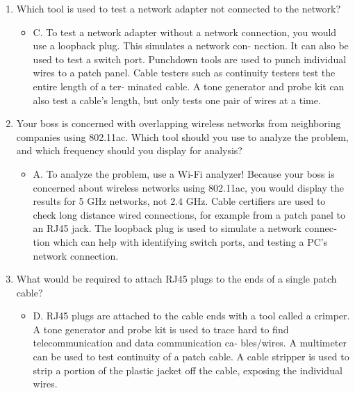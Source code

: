 \documentclass{article}
\begin{document}
\begin{enumerate}
\begin{itemize}
    \end{itemize}
    \item Which tool is used to test a network adapter not connected to
the network?
    \begin{itemize}
        \item C. To test a network adapter without a network connection,
you would use a loopback plug. This simulates a network con‐
nection. It can also be used to test a switch port. Punchdown
tools are used to punch individual wires to a patch panel. Cable
testers such as continuity testers test the entire length of a ter‐
minated cable. A tone generator and probe kit can also test a
cable’s length, but only tests one pair of wires at a time.
    \end{itemize}
    \item Your boss is concerned with overlapping wireless networks
from neighboring companies using 802.11ac. Which tool
should you use to analyze the problem, and which frequency
should you display for analysis?
    \begin{itemize}
        \item A. To analyze the problem, use a Wi-Fi analyzer! Because
your boss is concerned about wireless networks using
802.11ac, you would display the results for 5 GHz networks,
not 2.4 GHz. Cable certifiers are used to check long distance
wired connections, for example from a patch panel to an RJ45
jack. The loopback plug is used to simulate a network connec‐
tion which can help with identifying switch ports, and testing a
PC’s network connection.
    \end{itemize}
    \item What would be required to attach RJ45 plugs to the ends of a
single patch cable?
    \begin{itemize}
        \item D. RJ45 plugs are attached to the cable ends with a tool called
a crimper. A tone generator and probe kit is used to trace hard
to find telecommunication and data communication ca‐
bles/wires. A multimeter can be used to test continuity of a
patch cable. A cable stripper is used to strip a portion of the
plastic jacket off the cable, exposing the individual wires.
    \end{itemize}
    
\end{enumerate}
\end{document}
